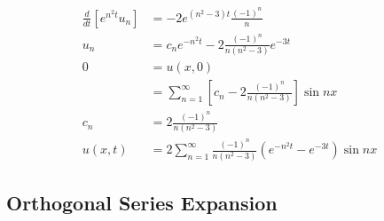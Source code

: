 \documentclass{article}
\begin{document}
\begin{align*}
  \frac{d}{d t} [e^{n^2 t} u_n]                        & = -2 e^{(n^2 - 3) t} \frac{(-1)^n}{n}                                                            \\
  u_n                                                  & = c_n e^{-n^2 t} - 2 \frac{(-1)^n}{n (n^2 - 3)} e^{-3 t}                                         \\
  0                                                    & = u(x, 0)                                                                                        \\
                                                       & = \sum_{n = 1}^\infty \left[ c_n - 2 \frac{(-1)^n}{n (n^2 - 3)} \right] \sin n x                 \\
  c_n                                                  & = 2 \frac{(-1)^n}{n (n^2 - 3)}                                                                   \\
  u(x, t)                                              & = 2 \sum_{n = 1}^\infty \frac{(-1)^n}{n (n^2 - 3)} \left( e^{-n^2 t} - e^{-3 t} \right) \sin n x
\end{align*}

\subsection{Orthogonal Series Expansion}

\subsubsection{}
\end{document}
